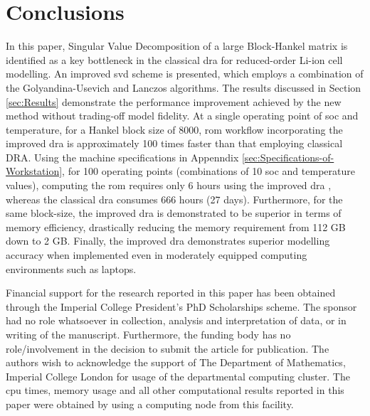 \section{Conclusions\label{sec:Conclusion}}  In   this  paper,   Singular  Value
Decomposition of a  large Block-Hankel matrix is identified as  a key bottleneck
in  the  classical  \gls{dra}  for   reduced-order  Li-ion  cell  modelling.  An
improved  \gls{svd} scheme  is presented,  which  employs a  combination of  the
Golyandina-Usevich  and Lanczos  algorithms.  The results  discussed in  Section
\ref{sec:Results} demonstrate  the performance  improvement achieved by  the new
method  without trading-off  model  fidelity.  At a  single  operating point  of
\gls{soc} and temperature,  for a Hankel block size of  8000, \gls{rom} workflow
incorporating  the improved  \gls{dra} is  approximately 100  times faster  than
that  employing classical  DRA. Using  the machine  specifications in  Appenndix
\ref{sec:Specifications-of-Workstation}, for 100  operating points (combinations
of 10 \gls{soc} and temperature values), computing the \gls{rom} requires only 6
hours using  the improved \gls{dra}  , whereas the classical  \gls{dra} consumes
666  hours  (27  days).  Furthermore,  for the  same  block-size,  the  improved
\gls{dra}  is  demonstrated  to  be  superior in  terms  of  memory  efficiency,
drastically reducing the  memory requirement from 112 GB down  to 2 GB. Finally,
the improved \gls{dra} demonstrates superior modelling accuracy when implemented
even in moderately equipped computing environments such as laptops.

\begin{acknowledgment}
    Financial support for the research reported in this paper has been
    obtained through the Imperial College President's PhD Scholarships
    scheme. The sponsor had no role whatsoever in collection, analysis
    and interpretation of data, or in writing of the manuscript. Furthermore,
    the funding body has no role/involvement in the decision to submit
    the article for publication. The authors wish to acknowledge the support
    of The Department of Mathematics, Imperial College London for usage
    of the departmental computing cluster. The \gls{cpu} times, memory usage
    and all other computational results reported in this paper were obtained
    by using a computing node from this facility.
\end{acknowledgment}

